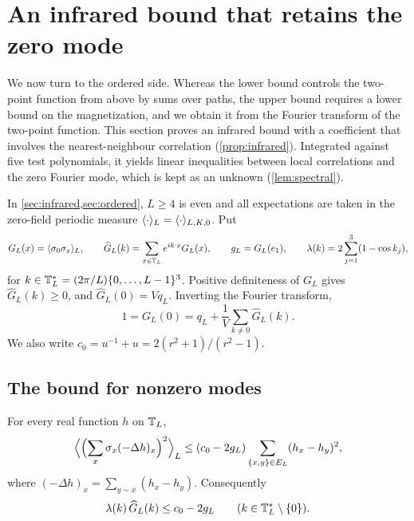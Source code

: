 \section{An infrared bound that retains the zero mode}\label{sec:infrared}

We now turn to the ordered side. Whereas the lower bound controls the two-point function from above by sums over paths, the upper bound requires a lower bound on the magnetization, and we obtain it from the Fourier transform of the two-point function. This section proves an infrared bound with a coefficient that involves the nearest-neighbour correlation (\cref{prop:infrared}). Integrated against five test polynomials, it yields linear inequalities between local correlations and the zero Fourier mode, which is kept as an unknown (\cref{lem:spectral}).

In \cref{sec:infrared,sec:ordered}, $L\ge4$ is even and all expectations are taken in the zero-field periodic measure $\langle \cdot\rangle_L=\langle \cdot\rangle_{L,K,0}$. Put
\[
 G_L(x)=\langle \sigma_0\sigma_x\rangle_L,\qquad \widehat G_L(k)=\sum_{x\in\mathbb T_L}e^{ik\cdot x}G_L(x),\qquad
 g_L=G_L(e_1),\qquad \lambda(k)=2\sum_{j=1}^3(1-\cos k_j),
\]
for $k\in\mathbb T_L^*=(2\pi/L)\{0,\dots,L-1\}^3$. Positive definiteness of $G_L$ gives $\widehat G_L(k)\ge0$, and $\widehat G_L(0)=Vq_L$. Inverting the Fourier transform,
\begin{equation}\label{eq:sumrule}
 1=G_L(0)=q_L+\frac1V\sum_{k\ne0}\widehat G_L(k).
\end{equation}
We also write $c_0=u^{-1}+u=2(r^2+1)/(r^2-1)$.

\subsection{The bound for nonzero modes}

\begin{proposition}\label{prop:infrared}
For every real function $h$ on $\mathbb T_L$,
\begin{equation}\label{eq:varbound}
 \Bigl\langle\Bigl(\sum_x\sigma_x(-\Delta h)_x\Bigr)^2\Bigr\rangle_L\le(c_0-2g_L)\sum_{\{x,y\}\in E_L}(h_x-h_y)^2,
\end{equation}
where $(-\Delta h)_x=\sum_{y\sim x}(h_x-h_y)$. Consequently
\begin{equation}\label{eq:IR}
 \lambda(k)\,\widehat G_L(k)\le c_0-2g_L\qquad(k\in\mathbb T^*_L\setminus\{0\}).
\end{equation}
\end{proposition}

